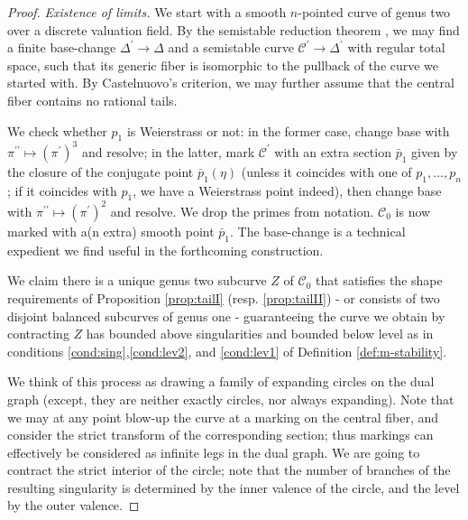 \documentclass[11pt]{amsart}
\renewcommand{\to}{\rightarrow}
\newcommand{\dvr}{\Delta}
\theoremstyle{plain}
\theoremstyle{definition}
\begin{document}
\begin{proof}
 \emph{Existence of limits.}
  We start with a smooth $n$-pointed curve of genus two over a discrete valuation field. By the semistable reduction theorem \cite[Corollary 2.7]{DM}, we may find a finite base-change $\dvr^\prime\to\dvr$ and a semistable curve $\mathcal C^\prime\to\dvr^\prime$ with regular total space, such that its generic fiber is isomorphic to the pullback of the curve we started with. By Castelnuovo's criterion, we may further assume that the central fiber contains no rational tails.
  
  We check whether $p_1$ is Weierstrass or not: in the former case, change base with $\pi^{\prime\prime}\mapsto(\pi^\prime)^3$ and resolve; in the latter, mark $\mathcal C^\prime$ with an extra section $\bar p_1$ given by the closure of the conjugate point $\bar p_1(\eta)$ (unless it coincides with one of $p_1,\ldots,p_n$; if it coincides with $p_1$, we have a Weierstrass point indeed), then change base with $\pi^{\prime\prime}\mapsto(\pi^\prime)^2$ and resolve. We drop the primes from notation. $\mathcal C_0$ is now marked with a(n extra) smooth point $\bar p_1$. The base-change is a technical expedient we find useful in the forthcoming construction.
  
  We claim there is a unique genus two subcurve $Z$ of $\mathcal C_0$ that satisfies the shape requirements of Proposition \ref{prop:tailI} (resp. \ref{prop:tailII}) - or consists of two disjoint balanced subcurves of genus one - guaranteeing the curve we obtain by contracting $Z$ has bounded above singularities and bounded below level as in conditions \eqref{cond:sing},\eqref{cond:lev2}, and \eqref{cond:lev1} of Definition \ref{def:m-stability}.
  
  We think of this process as drawing a family of expanding circles on the dual graph (except, they are neither exactly circles, nor always expanding). Note that we may at any point blow-up the curve at a marking on the central fiber, and consider the strict transform of the corresponding section; thus markings can effectively be considered as infinite legs in the dual graph. We are going to contract the strict interior of the circle; note that the number of branches of the resulting singularity is determined by the inner valence of the circle, and the level by the outer valence.
  

\end{proof}
\end{document}
